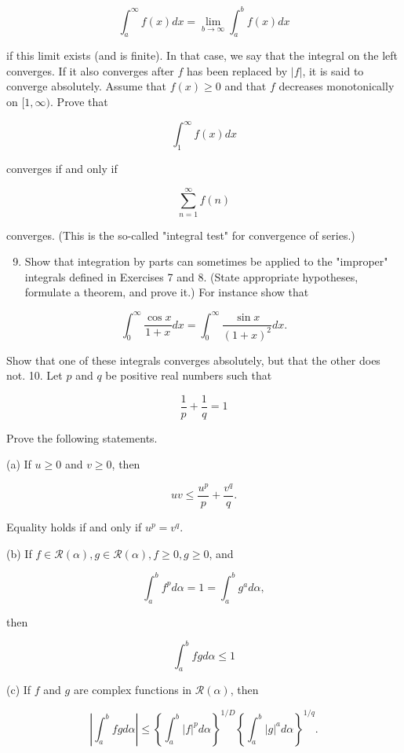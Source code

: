 \documentclass[10pt]{article}
\begin{document}
$$
\int_{a}^{\infty} f(x) d x=\lim _{b \rightarrow \infty} \int_{a}^{b} f(x) d x
$$

if this limit exists (and is finite). In that case, we say that the integral on the left converges. If it also converges after $f$ has been replaced by $|f|$, it is said to converge absolutely. Assume that $f(x) \geq 0$ and that $f$ decreases monotonically on $[1, \infty)$. Prove that

$$
\int_{1}^{\infty} f(x) d x
$$

converges if and only if

$$
\sum_{n=1}^{\infty} f(n)
$$

converges. (This is the so-called "integral test" for convergence of series.)

\begin{enumerate}
  \setcounter{enumi}{8}
  \item Show that integration by parts can sometimes be applied to the "improper" integrals defined in Exercises 7 and 8. (State appropriate hypotheses, formulate a theorem, and prove it.) For instance show that
\end{enumerate}

$$
\int_{0}^{\infty} \frac{\cos x}{1+x} d x=\int_{0}^{\infty} \frac{\sin x}{(1+x)^{2}} d x .
$$

Show that one of these integrals converges absolutely, but that the other does not. 10. Let $p$ and $q$ be positive real numbers such that

$$
\frac{1}{p}+\frac{1}{q}=1
$$

Prove the following statements.

(a) If $u \geq 0$ and $v \geq 0$, then

$$
u v \leq \frac{u^{p}}{p}+\frac{v^{q}}{q} .
$$

Equality holds if and only if $u^{p}=v^{q}$.

(b) If $f \in \mathscr{R}(\alpha), g \in \mathscr{R}(\alpha), f \geq 0, g \geq 0$, and

$$
\int_{a}^{b} f^{p} d \alpha=1=\int_{a}^{b} g^{a} d \alpha,
$$

then

$$
\int_{a}^{b} f g d \alpha \leq 1
$$

(c) If $f$ and $g$ are complex functions in $\mathscr{R}(\alpha)$, then

$$
\left|\int_{a}^{b} f g d \alpha\right| \leq\left\{\int_{a}^{b}|f|^{p} d \alpha\right\}^{1 / D}\left\{\int_{a}^{b}|g|^{a} d \alpha\right\}^{1 / q} .
$$
\end{document}
